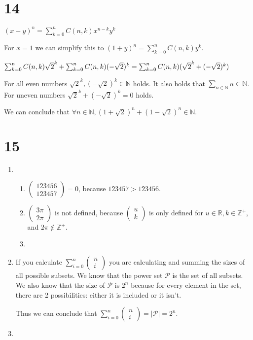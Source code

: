 \documentclass[12pt]{article}
\begin{document}
\section*{14}
$(x + y)^n = \sum_{k = 0}^{n} C(n, k) x^{n - k} y^k$

For $x = 1$ we can simplify this to $(1 + y)^n = \sum_{k = 0}^{n} C(n, k) y^k$.

$\sum_{k = 0}^{n} C(n, k) \sqrt{2}^k + \sum_{k = 0}^{n} C(n, k) (-\sqrt{2})^k\\
=\sum_{k = 0}^{n} C(n, k)(\sqrt{2}^k + (-\sqrt{2})^k)$


For all even numbers $\sqrt{2}^k, (-\sqrt{2})^k \in \mathbb{N}$ holds. It also holds that $\sum_{n \in \mathbb{N}} n \in \mathbb{N}$.\\
For uneven numbers $\sqrt{2}^k + (-\sqrt{2})^k = 0$ holds.

We can conclude that $\forall n \in \mathbb{N}, (1 + \sqrt{2})^n + (1 - \sqrt{2})^n \in \mathbb{N}$.

\section*{15}
\begin{enumerate}[a]
	\item %
	\begin{enumerate}[i]
		\item %
		$\begin{pmatrix}
			123456 \\ 123457
		\end{pmatrix} = 0$, because $123457 > 123456$.
		\item %
		$\begin{pmatrix}
			3 \pi \\ 2 \pi
		\end{pmatrix}$ is not defined, because $\begin{pmatrix}
			u \\ k
		\end{pmatrix}$ is only defined for $u \in \mathbb{R}, k \in \mathbb{Z}^+$, and $2 \pi \not \in \mathbb{Z}^+$.
		\item %
	\end{enumerate}
	\item %
	If you calculate $\sum_{i = 0}^{n} \begin{pmatrix}
		n \\ i
	\end{pmatrix}$ you are calculating and summing the sizes of all possible subsets. We know that the power set $\mathcal{P}$ is the set of all subsets. We also know that the size of $\mathcal{P}$ is $2^n$ because for every element in the set, there are 2 possibilities: either it is included or it isn't.

	Thus we can conclude that $\sum_{i = 0}^{n} \begin{pmatrix}
		n \\ i
	\end{pmatrix} = | \mathcal{P} | = 2^n$.
	\item %
\end{enumerate}
\end{document}
